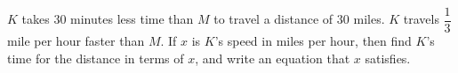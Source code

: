 $K$ takes $30$ minutes less time than $M$ to travel a distance of $30$ miles. $K$ travels $\dfrac{1}{3}$ mile per hour faster than $M$. If $x$ is $K$'s speed in miles per hour, then find $K$'s time for the distance in terms of $x$, and write an equation that $x$ satisfies.
